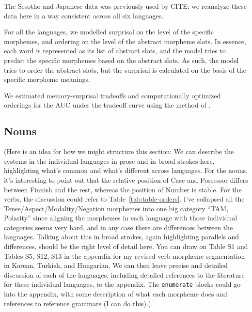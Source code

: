 \documentclass[11pt,letterpaper]{article}
\newcommand\mhahn[1]{{\color{red}(#1)}}
\begin{document}
\begin{itemize}
The Sesotho and Japanese data was previously used by CITE; we reanalyze these data here in a way consistent across all six languages.

For all the languages, we modelled surprisal on the level of the specific morphemes, and ordering on the level of the abstract morpheme slots. In essence, each word is represented as its list of abstract slots, and the model tries to predict the specific morphemes based on the abstract slots. As such, the model tries to order the abstract slots, but the surprisal is calculated on the basis of the specific morpheme meanings.
\end{itemize}


We estimated memory-surprisal tradeoffs and computationally optimized orderings for the AUC under the tradeoff curve using the method of \citet{Hahn2020modeling}.




\subsection{Nouns}

\mhahn{Here is an idea for how we might structure this section: We can describe the systems in the individual languages in prose and in broad strokes here, highlighting what's common and what's different across languages. For the nouns, it's interesting to point out that the relative position of Case and Possessor differs between Finnish and the rest, whereas the position of Number is stable. For the verbs, the discussion could refer to Table~\ref{tab:table-orders}. I've collapsed all the Tense/Aspect/Modality/Negation morphemes into one big category ``TAM, Polarity'' since aligning the morphemes in each language with those individual categories seems very hard, and in any case there are differences between the languages. Talking about this in broad strokes, again highlighting parallels and differences, should be the right level of detail here. You can draw on Table S1 and Tables S5, S12, S13 in the appendix for my revised verb morpheme segmentation in Korean, Turkish, and Hungarian. We can then leave precise and detailed discussion of each of the languages, including detailed references to the literature for these individual languages, to the appendix. The \texttt{enumerate} blocks could go into the appendix, with some description of what each morpheme does and references to reference grammars (I can do this).}
\end{document}
